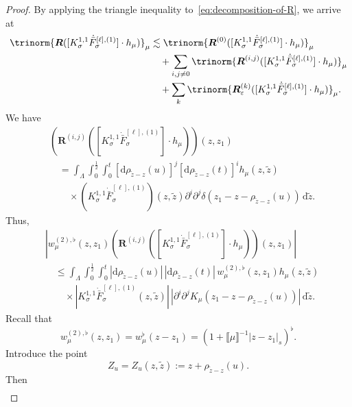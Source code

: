 \documentclass{article}
\numberwithin{equation}{section}
\newcommand{\assign}{:=}
\newcommand{\mathd}{\mathrm{d}}
\theoremstyle{plain}
\theoremstyle{definition}
\begin{document}
\begin{proof}
  By applying the triangle inequality to~\eqref{eq:decomposition-of-R}, we
  arrive at
  \begin{align*}
    \trinorm{ \boldsymbol{R} ([K^{1, 1}_{\sigma} \dot{\bar{F}}_{\sigma}^{[\ell],
    (1)}] \cdot h_{\mu}) }_{\mu} &\lesssim  \trinorm{
    \boldsymbol{R}^{(0)} ([K^{1, 1}_{\sigma} \dot{\bar{F}}_{\sigma}^{[\ell],
    (1)}] \cdot h_{\mu}) }_{\mu}\\
 &\quad + \sum_{i, j \neq 0} \trinorm{ \boldsymbol{R}^{(i, j)} ([K^{1,
    1}_{\sigma} \dot{\bar{F}}_{\sigma}^{[\ell], (1)}] \cdot h_{\mu})
    }_{\mu}\\
 &\quad + \sum_k \trinorm{ \boldsymbol{R}^{(k)}_{\varepsilon} ([K^{1,
    1}_{\sigma} \dot{\bar{F}}_{\sigma}^{[\ell], (1)}] \cdot h_{\mu})
    }_{\mu} .
  \end{align*}
  We have
  \begin{align*}
    &(\boldsymbol{R}^{(i, j)} ([K^{1, 1}_{\sigma}
    \dot{\bar{F}}_{\sigma}^{[\ell], (1)}] \cdot h_{\mu})) (z, z_1)\\
    &\quad = \int_{\Lambda} \int_0^{\frac{1}{2}} \int_0^t
    [\mathd \rho _{\tilde{z} - z} (u)]^j
    [\mathd \rho _{\tilde{z} - z} (t)]^i
    h_{\mu}(z, \tilde{z})\\
    &\qquad \times
    (K^{1, 1}_{\sigma} \dot{\bar{F}}_{\sigma}^{[\ell], (1)})(z, \tilde{z})
    \partial^i \partial^j
    \delta (z_1 - z - \rho_{\tilde{z} - z} (u))
    \,\mathd \tilde{z} .
  \end{align*}
  Thus,
  \begin{align*}
    &| w^{(2), \flat}_{\mu} (z, z_1)
    (\boldsymbol{R}^{(i, j)} ([K^{1, 1}_{\sigma}
    \dot{\bar{F}}_{\sigma}^{[\ell], (1)}] \cdot h_{\mu})) (z, z_1) |\\
    &\quad \leqslant \int_{\Lambda} \int_0^{\frac{1}{2}} \int_0^t
    | \mathd \rho _{\tilde{z} - z} (u) |
    \,| \mathd \rho _{\tilde{z} - z} (t) |\,
    w^{(2), \flat}_{\mu} (z, z_1) h_{\mu} (z, \tilde{z})\\
    &\qquad \times
    | K^{1, 1}_{\sigma} \dot{\bar{F}}_{\sigma}^{[\ell], (1)} (z, \tilde z) |
    \,| \partial^i \partial^j
    K_{\mu} (z_1 - z - \rho_{\tilde{z} - z} (u)) |\,
    \mathd \tilde{z} .
  \end{align*}
  Recall that
  \[
  w_{\mu}^{(2), \flat} (z, z_1) = w_{\mu}^{\flat} (z - z_1)
  = (1 + \llbracket \mu \rrbracket^{- 1} | z - z_1 |_s)^{\flat}.
  \]
  Introduce the point
  \[
  Z_u=Z_u(z,\tilde z) \assign z+\rho_{\tilde z-z}(u).
  \]
  Then
  \begin{align*}

\end{align*}
\end{proof}
\end{document}

